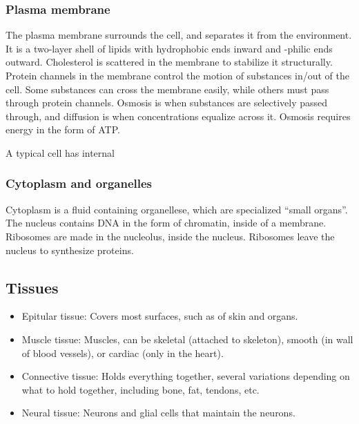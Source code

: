 \subsubsection{Plasma membrane}
The plasma membrane surrounds the cell, and separates it from the environment. It is a two-layer shell of lipids with hydrophobic ends inward and -philic ends outward. Cholesterol is scattered in the membrane to stabilize it structurally. Protein channels in the membrane control the motion of substances in/out of the cell. Some substances can cross the membrane easily, while others must pass through protein channels. Osmosis is when substances are selectively passed through, and diffusion is when concentrations equalize across it. Osmosis requires energy in the form of ATP.

A typical cell has internal 

\subsubsection{Cytoplasm and organelles}
Cytoplasm is a fluid containing organellese, which are specialized ``small organs''. The nucleus contains DNA in the form of chromatin, inside of a membrane. Ribosomes are made in the nucleolus, inside the nucleus. Ribosomes leave the nucleus to synthesize proteins.

\subsection{Tissues}
\begin{itemize}
  \item Epitular tissue: Covers most surfaces, such as of skin and organs.
  \item Muscle tissue: Muscles, can be skeletal (attached to skeleton), smooth (in wall of blood vessels), or cardiac (only in the heart).
  \item Connective tissue: Holds everything together, several variations depending on what to hold together, including bone, fat, tendons, etc.
  \item Neural tissue: Neurons and glial cells that maintain the neurons.
\end{itemize}

